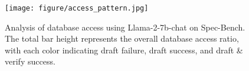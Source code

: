 \begin{figure}[h]
\centering
\texttt{[image: figure/access\_pattern.jpg]}
\vspace{-.8em}
\caption{\small Analysis of database access using Llama-2-7b-chat on Spec-Bench. The total bar height represents the overall database access ratio, with each color indicating draft failure, draft success, and draft \& verify success.}
\label{fig:access_pattern}
\vspace{-.5em}
\end{figure}
